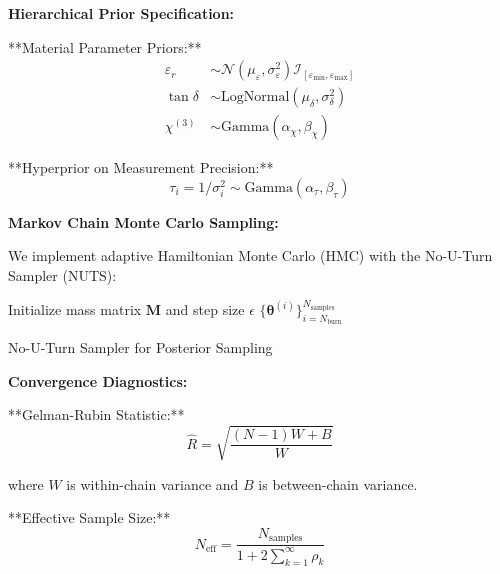 \documentclass[11pt]{article}
\begin{document}
\textbf{Hierarchical Prior Specification:}

**Material Parameter Priors:**
\begin{align}
\varepsilon_r &\sim \mathcal{N}(\mu_{\varepsilon}, \sigma_{\varepsilon}^2) \mathcal{I}_{[\varepsilon_{\min}, \varepsilon_{\max}]} \\
\tan\delta &\sim \text{LogNormal}(\mu_{\delta}, \sigma_{\delta}^2) \\
\chi^{(3)} &\sim \text{Gamma}(\alpha_{\chi}, \beta_{\chi})
\end{align}

**Hyperprior on Measurement Precision:**
\begin{equation}
\tau_i = 1/\sigma_i^2 \sim \text{Gamma}(\alpha_{\tau}, \beta_{\tau})
\end{equation}

\textbf{Markov Chain Monte Carlo Sampling:}

We implement adaptive Hamiltonian Monte Carlo (HMC) with the No-U-Turn Sampler (NUTS):

\begin{algorithm}[H]
\SetAlgoLined
{}
Initialize mass matrix $\mathbf{M}$ and step size $\epsilon$\;
\Return $\{\boldsymbol{\theta}^{(i)}\}_{i=N_{\text{burn}}}^{N_{\text{samples}}}$\;
\caption{No-U-Turn Sampler for Posterior Sampling}
\end{algorithm}

\textbf{Convergence Diagnostics:}

**Gelman-Rubin Statistic:**
\begin{equation}
\hat{R} = \sqrt{\frac{(N-1)W + B}{W}}
\end{equation}

where $W$ is within-chain variance and $B$ is between-chain variance.

**Effective Sample Size:**
\begin{equation}
N_{\text{eff}} = \frac{N_{\text{samples}}}{1 + 2\sum_{k=1}^{\infty} \rho_k}
\end{equation}
\end{document}
